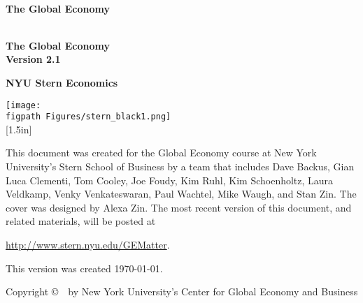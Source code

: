 \begin{titlepage}

\begin{center}
\textsc{}\\[1.5in]
{\Huge\bf The Global Economy} \\ [0.5in]
\end{center}

\pagebreak
\phantom{x}
\thispagestyle{empty}

\pagebreak
\thispagestyle{empty}
\begin{center}
\textsc{}\\[1.5in]
{\Huge\bf The Global Economy} \\ [0.25in]
{\huge\bf Version 2.1}

\vspace*{1.00in}
{\huge\bf NYU Stern Economics}

\vfill
{\texttt{[image: \\figpath Figures/stern\_black1.png]}\\
[1.5in]
}
\end{center}


\newpage
\thispagestyle{empty}
\phantom{x}
\vfill
This document was created for the Global Economy course at New York
University's Stern School of Business by a team that includes
Dave Backus, Gian Luca Clementi, Tom Cooley, Joe Foudy, Kim Ruhl,
Kim Schoenholtz, Laura Veldkamp, Venky Venkateswaran, Paul Wachtel, Mike Waugh,
and Stan Zin.
The cover was designed by Alexa Zin.
The most recent version of this document, and related materials,
will be posted at

\vspace*{\parskip}
\centerline{\url{http://www.stern.nyu.edu/GEMatter}.}

This version was created \today.

Copyright \copyright \ \number\year \ by New York University's Center for Global Economy and Business


\end{titlepage}
